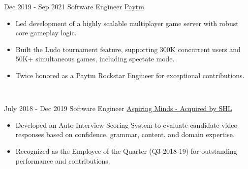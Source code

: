\documentclass[letterpaper]{twentysecondcv} %
\begin{document}
\begin{fullwidth}
\begin{twenty}
     \twentyitem
   		{Dec 2019 -}
		{Sep 2021}
        {Software Engineer}
        {\href{https://paytm.com/}{Paytm}}
        {}
        {\begin{itemize}
        \item Led development of a highly scalable multiplayer game server with robust core gameplay logic.
        \item Built the Ludo tournament feature, supporting 300K concurrent users and 50K+ simultaneous games, including spectate mode.
        \item Twice honored as a Paytm Rockstar Engineer for exceptional contributions.
        \end{itemize}}
    \\
\end{twenty}
\begin{twenty}
     \twentyitem
   		{July 2018 -}
		{Dec 2019}
        {Software Engineer}
        {\href{https://www.shl.com/en-in/}{Aspiring Minds - Acquired by SHL}}
        {}
        {\begin{itemize}
        \item Developed an Auto-Interview Scoring System to evaluate candidate video responses based on confidence, grammar, content, and domain expertise.
        \item Recognized as the Employee of the Quarter (Q3 2018-19) for outstanding performance and contributions.
        \end{itemize}}
    \\
\end{twenty}


\end{fullwidth}
\end{document}
